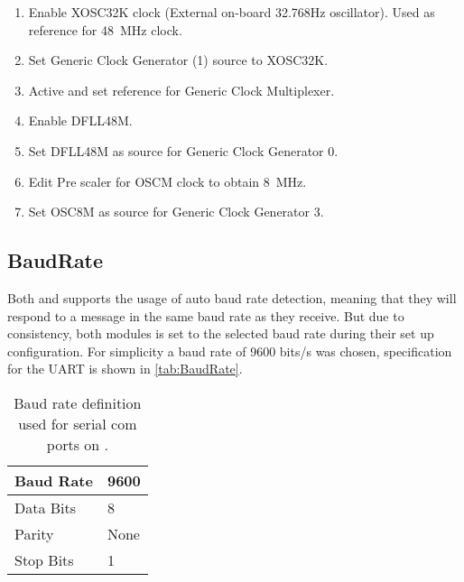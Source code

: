 \begin{enumerate}
	\item Enable XOSC32K clock (External on-board 32.768Hz oscillator). Used as reference for \SI{48}{\mega\hertz} clock.
	\item Set Generic Clock Generator (1) source to XOSC32K.
	\item Active and set reference for Generic Clock Multiplexer.
	\item Enable DFLL48M.
	\item Set DFLL48M as source for Generic Clock Generator 0.
	\item Edit Pre scaler for OSCM clock to obtain \SI{8}{\mega\hertz}.
	\item Set OSC8M as source for Generic Clock Generator 3.
\end{enumerate} 

\subsection{BaudRate}
Both \SARA and \GPS supports the usage of auto baud rate detection, meaning that they will respond to a message in the same baud rate as they receive. But due to consistency, both modules is set to the selected baud rate during their set up configuration. 
For simplicity a baud rate of 9600 bits/s was chosen, specification for the UART is shown in \vref{tab:BaudRate}.
\begin{table}[H]
	\begin{tabular}{ll}
		\hline 
		Baud Rate & 9600 \\ 
		\hline 
		Data Bits & 8 \\ 
		\hline 
		Parity & None \\ 
		\hline 
		Stop Bits & 1 \\ 
		\hline 
	\end{tabular}
	\centering
	\caption{Baud rate definition used for serial com ports on \SAMD.}
	\label{tab:BaudRate}
\end{table} 

\FloatBarrier